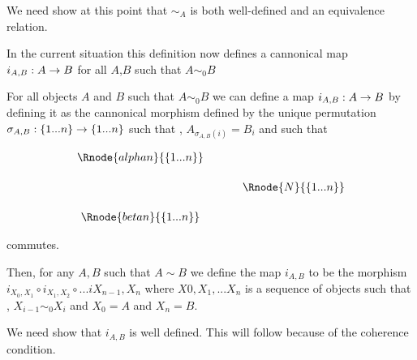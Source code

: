 \documentclass[10pt,a4paper]{scrartcl}
\begin{document}
We need show at this point that $\sim_A$ is both well-defined and an equivalence relation.

\begin{oldtt}
\begin{notebox}
In the current situation this definition now defines a cannonical map $i_{A,B}: A \rightarrow B$ 
for all $A$,$B$ such that $A \sim_0 B$ 
\end{notebox}
\begin{notebox}
For all objects $A$ and $B$ such
that $A \sim_0 B$ we can define a map $i_{A,B}: A \rightarrow B$ by defining it as the cannonical
morphism defined by the unique permutation $\sigma_{A,B} : \left\{1...n\right\} \rightarrow \left\{1...n\right\}$ 
such that \foreachi, $A_{\sigma_{A,B}(i)}=B_i$ and such that
\begin{center}
\begin{equation}
\label{preservingcopynumber}
\begin{array}{cp{.5cm}c}
\Rnode{alphan}{\set{\n}}  &&              \\ [0.5cm]
												  && \Rnode{N}{\set{\n}} \\ [0.5cm]
\Rnode{betan}{\set{\n}}   &&            
\end{array}
\end{equation}
\end{center}
commutes. 
\end{notebox}
\end{oldtt}

\begin{notebox}
Then, for any $A,B$ such that $A \sim B$ we define the map $i_{A,B}$ to be the morphism
$i_{X_0,X_1} \circ i_{X_1,X_2} \circ ... i{X_{n-1},X_n}$ where $X0,X_1,...X_n$ is a sequence
of objects such that \foreachi, $X_{i-1} \sim_0 X_i$ and $X_0=A$ and $X_n=B$. 

We need show that $i_{A,B}$ is well defined. This will follow because of the coherence
condition. 
\end{notebox}
\end{document}
